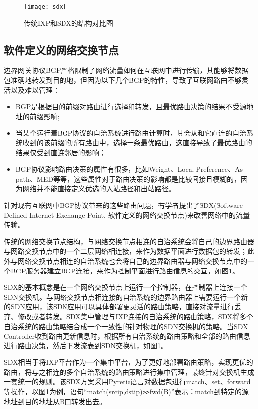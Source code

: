 \begin{figure}
  \centering
  \texttt{[image: sdx]}
  \caption{传统IXP和SDX的结构对比图}
  \label{fig:sdx}
\end{figure}

\subsection{软件定义的网络交换节点}
边界网关协议BGP严格限制了网络流量如何在互联网中进行传输，其能够将数据包准确地转发到目的地，但因为以下几个BGP的特性，导致了互联网路由不够灵活以及难以管理\cite{sdx2015sigcomm}：
\begin{itemize}
  \item BGP是根据目的前缀对路由进行选择和转发，且最优路由决策的结果不受源地址的前缀影响;
  \item 当某个运行着BGP协议的自治系统进行路由计算时，其会从和它直连的自治系统收到的该前缀的所有路由中，选择一条最优路由，这直接导致了最优路由的结果仅受到直连邻居的影响；
  \item BGP协议影响路由决策的属性有很多，比如Weight、Local Preference、As-path、MED等等，这些属性对于路由决策的影响都是比较间接且模糊的，因为网络并不能直接定义优选的入站路径和出站路径。
\end{itemize}

针对现有互联网中BGP协议带来的这些路由问题，有学者提出了SDX\cite{sdx2015sigcomm}(Software Defined Internet Exchange Point, 软件定义的网络交换节点)来改善网络中的流量传输。


传统的网络交换节点结构，与网络交换节点相连的自治系统会将自己的边界路由器与网路交换节点中的一个二层网络相连接，来作为数据平面进行数据包的转发；此外与网络交换节点相连的自治系统也会将自己的边界路由器与网络交换节点中的一个BGP服务器建立BGP连接，来作为控制平面进行路由信息的交互，如图\ref{fig:sdx}。


SDX的基本概念是在一个网络交换节点上运行一个控制器，在控制器上连接一个SDN交换机。与网络交换节点相连接的自治系统的边界路由器上需要运行一个新的SDN应用，该SDN应用可以具体部署更灵活的路由策略，直接对流量进行丢弃、修改或者转发。SDX集中管理与IXP连接的自治系统的路由策略，SDX将多个自治系统的路由策略结合成一个一致性的针对物理的SDN交换机的策略。当SDX Controller收到路由更新信息时，根据所有自治系统的路由策略和全部的路由信息进行路由决策，然后下发流表到SDN交换机，如图\ref{fig:sdx}。


SDX相当于将IXP平台作为一个集中平台，为了更好地部署路由策略，实现更优的路由，将与之相连的多个自治系统的路由策略进行集中管理，最终针对交换机生成一套统一的规则。该SDX方案采用Pyretic\cite{monsanto2013}语言对数据包进行match、set、forward等操作，以图\ref{fig:sdx}为例，语句“match(srcip,dstip)\verb+>>+fwd(B)”表示：match到特定的源地址到目的地址从B口转发出去。

